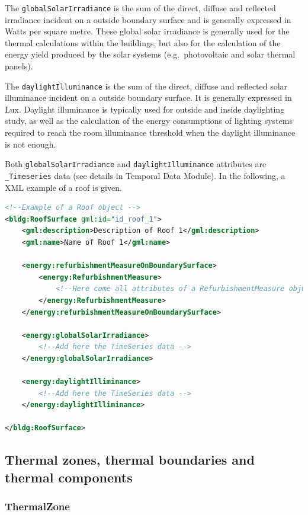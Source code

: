 \documentclass[a4paper,12pt]{article}
\begin{document}
The \lstinline!globalSolarIrradiance! is the sum of the direct, diffuse
and reflected irradiance incident on a outside boundary surface and is
generally expressed in Watts per square metre. These global solar
irradiance is generally used for the thermal calculations within the
buildings, but also for the calculation of the energy yield produced by
the solar systems (e.g.~photovoltaic and solar thermal panels).

The \lstinline!daylightIlluminance! is the sum of the direct, diffuse
and reflected solar illuminance incident on a outside boundary surface.
It is generally expressed in Lux. Daylight illuminance is typically used
for outside and inside daylighting study, as well as the calculation of
the energy consumptions of lighting systems required to reach the room
illuminance threshold when the daylight illuminance is not enough.

Both \lstinline!globalSolarIrradiance! and
\lstinline!daylightIlluminance! attributes are \lstinline!_Timeseries!
data (see details in Temporal Data Module). In the following, a XML
example of a roof is given.

\begin{lstlisting}[language=XML]
<!--Example of a Roof object -->
<bldg:RoofSurface gml:id="id_roof_1">
    <gml:description>Description of Roof 1</gml:description>
    <gml:name>Name of Roof 1</gml:name>

    <energy:refurbishmentMeasureOnBoundarySurface>
        <energy:RefurbishmentMeasure>
            <!--Here come all attributes of a RefurbishmentMeasure object (omitted here)-->
        </energy:RefurbishmentMeasure>
    </energy:refurbishmentMeasureOnBoundarySurface>

    <energy:globalSolarIrradiance>
        <!--Add here the TimeSeries data -->
    </energy:globalSolarIrradiance>

    <energy:daylightIlliminance>
        <!--Add here the TimeSeries data -->
    </energy:daylightIlliminance>

</bldg:RoofSurface>
\end{lstlisting}

\subsection{Thermal zones, thermal boundaries and thermal
components}\label{thermal-zones-thermal-boundaries-and-thermal-components}

\subsubsection{ThermalZone}\label{thermalzone}
\end{document}
